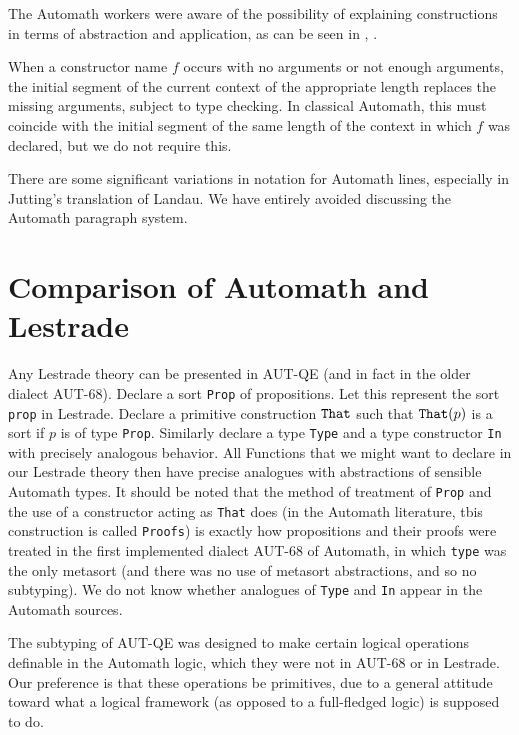\documentclass{article}
\begin{document}
The Automath workers were aware of the possibility of explaining constructions in terms of abstraction and application, as can be seen in \cite{autsl}, \cite{autlambda}.

When a constructor name $f$ occurs with no arguments or not enough arguments, the initial segment of the current context of the appropriate length replaces the missing arguments, subject to type checking.  In classical Automath, this must coincide with the initial segment of the same length of the context in which $f$ was declared, but we do not require this.

There are some significant variations in notation for Automath lines, especially in Jutting's translation of Landau.  We have entirely avoided discussing the Automath paragraph system.

\section{Comparison of Automath and Lestrade}

Any Lestrade theory can be presented in AUT-QE (and in fact in the older dialect AUT-68).  Declare a sort {\tt Prop} of propositions.  Let this represent the
sort {\tt prop} in Lestrade.  Declare a primitive construction ${\tt That}$ such that ${\tt That}(p)$ is a sort if $p$ is of type {\tt Prop}.
Similarly declare a type {\tt Type} and a type constructor {\tt In} with precisely analogous behavior.  All Functions that we might want to declare
in our Lestrade theory then have precise analogues with abstractions of sensible Automath types.  It should be noted that the method of treatment of {\tt Prop}
and the use of a constructor acting as {\tt That} does (in the Automath literature, tbis construction is called {\tt Proofs}) is exactly how propositions
and their proofs were treated in the first implemented dialect AUT-68 of Automath, in which {\tt type} was the only metasort (and there was no use
of metasort abstractions, and so no subtyping).  We do not know whether analogues of {\tt Type} and {\tt In} appear in the Automath sources.

The subtyping of AUT-QE was designed to make certain logical operations definable in the Automath logic, which they were not in AUT-68 or in Lestrade.
Our preference is that these operations be primitives, due to a general attitude toward what a logical framework (as opposed to a full-fledged logic) is supposed to do.
\end{document}
